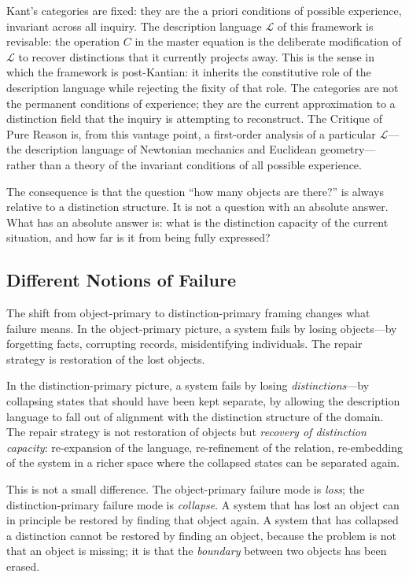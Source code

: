 \documentclass[12pt, letterpaper]{article}
\theoremstyle{remark}
\begin{document}
Kant's categories are fixed: they are the a priori conditions of possible
experience, invariant across all inquiry.  The description language
$\mathcal{L}$ of this framework is revisable: the operation $C$ in the
master equation is the deliberate modification of $\mathcal{L}$ to recover
distinctions that it currently projects away.  This is the sense in which
the framework is post-Kantian: it inherits the constitutive role of the
description language while rejecting the fixity of that role.  The categories
are not the permanent conditions of experience; they are the current
approximation to a distinction field that the inquiry is attempting to
reconstruct.  The Critique of Pure Reason is, from this vantage point, a
first-order analysis of a particular $\mathcal{L}$---the description language
of Newtonian mechanics and Euclidean geometry---rather than a theory of the
invariant conditions of all possible experience.

The consequence is that the question ``how many objects are there?'' is
always relative to a distinction structure.  It is not a question with an
absolute answer.  What has an absolute answer is: what is the distinction
capacity of the current situation, and how far is it from being fully
expressed?

\subsection{Different Notions of Failure}

The shift from object-primary to distinction-primary framing changes what
failure means.  In the object-primary picture, a system fails by losing
objects---by forgetting facts, corrupting records, misidentifying individuals.
The repair strategy is restoration of the lost objects.

In the distinction-primary picture, a system fails by losing
\emph{distinctions}---by collapsing states that should have been kept
separate, by allowing the description language to fall out of alignment with
the distinction structure of the domain.  The repair strategy is not
restoration of objects but \emph{recovery of distinction capacity}:
re-expansion of the language, re-refinement of the relation, re-embedding
of the system in a richer space where the collapsed states can be separated
again.

This is not a small difference.  The object-primary failure mode is
\emph{loss}; the distinction-primary failure mode is \emph{collapse}.
A system that has lost an object can in principle be restored by finding
that object again.  A system that has collapsed a distinction cannot be
restored by finding an object, because the problem is not that an object
is missing; it is that the \emph{boundary} between two objects has been
erased.
\end{document}

